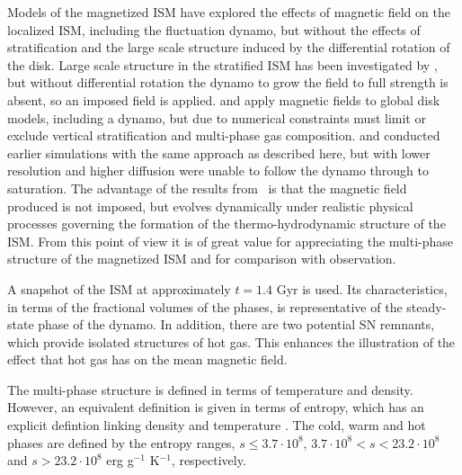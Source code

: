 \documentclass[useAMS,usenatbib]{mn2e}
\begin{document}
Models of the magnetized ISM \citep{Heitsch01,M-LBKA05} 
have explored the 
effects of magnetic field on the localized ISM, including the fluctuation 
dynamo, but without the effects of stratification and the large scale 
structure induced by the differential rotation of the disk.
Large scale structure in the stratified ISM has been investigated by
\citet{AB05a}, but without differential rotation the dynamo to grow the field
to full strength is absent, so an imposed field is applied. 
\citet{Hanasz05,Dobbs08} and \citet{Hanasz09} apply magnetic fields to global 
disk models, including a dynamo, but due to numerical constraints must limit or 
exclude vertical stratification and multi-phase gas composition.
\citet{Korpi99a} and \cite{Gressel08} conducted earlier simulations with the
same approach as described here, but with lower resolution and higher 
diffusion were unable to follow the dynamo through to saturation.
The advantage of the results from \MHD\ is that the magnetic field produced
is not imposed, but evolves dynamically under realistic physical processes
governing the formation of the thermo-hydrodynamic structure of the ISM.
From this point of view it is of great value for appreciating the 
multi-phase structure of the magnetized ISM and for comparison with observation.

A snapshot of the ISM at approximately $t=1.4$ Gyr is used. Its characteristics, in terms of the fractional volumes of the phases, is representative of the steady-state phase of the dynamo. In addition, there are two potential SN remnants, which provide isolated structures of hot gas. This enhances the illustration of the effect that hot gas has on the mean magnetic field. 

The multi-phase structure is defined in terms of temperature and density. However, an equivalent definition is given in terms of entropy, which has an explicit defintion linking density and temperature \citep{Gent12}. The cold, warm and hot phases are defined by the entropy ranges, $s\leq3.7\cdot10^8$, $3.7\cdot10^8<s<23.2\cdot10^8$ and $s>23.2\cdot10^8$ erg g$^{-1}$ K$^{-1}$, respectively. 
\end{document}
